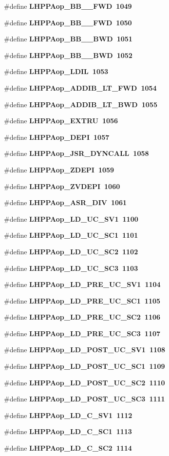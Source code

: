 \begin{CompactItemize}
\#define \bf{LHPPAop\_\-BB\_\_\-FWD}~1049
\item 
\#define \bf{LHPPAop\_\-BB\_\_\-FWD}~1050
\item 
\#define \bf{LHPPAop\_\-BB\_\_\-BWD}~1051
\item 
\#define \bf{LHPPAop\_\-BB\_\_\-BWD}~1052
\item 
\#define \bf{LHPPAop\_\-LDIL}~1053
\item 
\#define \bf{LHPPAop\_\-ADDIB\_\-LT\_\-FWD}~1054
\item 
\#define \bf{LHPPAop\_\-ADDIB\_\-LT\_\-BWD}~1055
\item 
\#define \bf{LHPPAop\_\-EXTRU}~1056
\item 
\#define \bf{LHPPAop\_\-DEPI}~1057
\item 
\#define \bf{LHPPAop\_\-JSR\_\-DYNCALL}~1058
\item 
\#define \bf{LHPPAop\_\-ZDEPI}~1059
\item 
\#define \bf{LHPPAop\_\-ZVDEPI}~1060
\item 
\#define \bf{LHPPAop\_\-ASR\_\-DIV}~1061
\item 
\#define \bf{LHPPAop\_\-LD\_\-UC\_\-SV1}~1100
\item 
\#define \bf{LHPPAop\_\-LD\_\-UC\_\-SC1}~1101
\item 
\#define \bf{LHPPAop\_\-LD\_\-UC\_\-SC2}~1102
\item 
\#define \bf{LHPPAop\_\-LD\_\-UC\_\-SC3}~1103
\item 
\#define \bf{LHPPAop\_\-LD\_\-PRE\_\-UC\_\-SV1}~1104
\item 
\#define \bf{LHPPAop\_\-LD\_\-PRE\_\-UC\_\-SC1}~1105
\item 
\#define \bf{LHPPAop\_\-LD\_\-PRE\_\-UC\_\-SC2}~1106
\item 
\#define \bf{LHPPAop\_\-LD\_\-PRE\_\-UC\_\-SC3}~1107
\item 
\#define \bf{LHPPAop\_\-LD\_\-POST\_\-UC\_\-SV1}~1108
\item 
\#define \bf{LHPPAop\_\-LD\_\-POST\_\-UC\_\-SC1}~1109
\item 
\#define \bf{LHPPAop\_\-LD\_\-POST\_\-UC\_\-SC2}~1110
\item 
\#define \bf{LHPPAop\_\-LD\_\-POST\_\-UC\_\-SC3}~1111
\item 
\#define \bf{LHPPAop\_\-LD\_\-C\_\-SV1}~1112
\item 
\#define \bf{LHPPAop\_\-LD\_\-C\_\-SC1}~1113
\item 
\#define \bf{LHPPAop\_\-LD\_\-C\_\-SC2}~1114
\item 

\end{CompactItemize}
